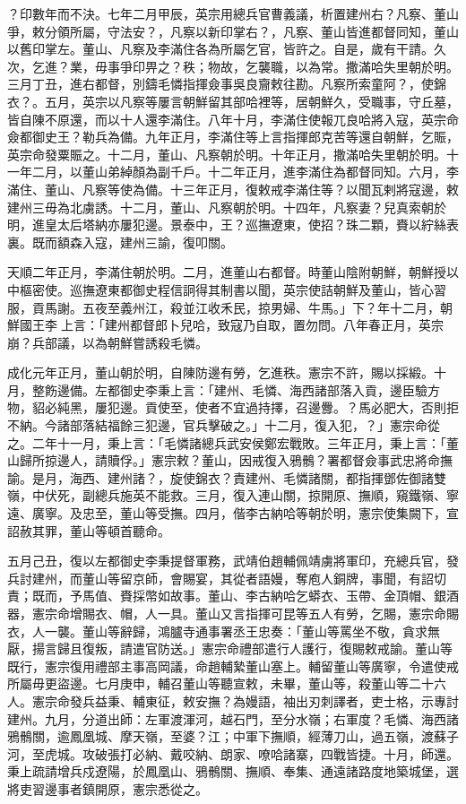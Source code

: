 \begin{pinyinscope}
？印數年而不決。七年二月甲辰，英宗用總兵官曹義議，析置建州右？凡察、董山爭，敕分領所屬，守法安？，凡察以新印掌右？，凡察、董山皆進都督同知，董山以舊印掌左。董山、凡察及李滿住各為所屬乞官，皆許之。自是，歲有干請。久次，乞進？業，毋事爭印畀之？秩；物故，乞襲職，以為常。撒滿哈失里朝於明。三月丁丑，進右都督，別鑄毛憐指揮僉事吳良齎敕往勘。凡察所索童阿？，使錦衣？。五月，英宗以凡察等屢言朝鮮留其部哈裡等，居朝鮮久，受職事，守丘墓，皆自陳不原還，而以十人還李滿住。八年十月，李滿住使報兀良哈將入寇，英宗命僉都御史王？勒兵為備。九年正月，李滿住等上言指揮郎克苦等還自朝鮮，乞賑，英宗命發粟賑之。十二月，董山、凡察朝於明。十年正月，撒滿哈失里朝於明。十一年二月，以董山弟綽顏為副千戶。十二年正月，進李滿住為都督同知。六月，李滿住、董山、凡察等使為備。十三年正月，復敕戒李滿住等？以聞瓦剌將寇邊，敕建州三毋為北虜誘。十二月，董山、凡察朝於明。十四年，凡察妻？兒真索朝於明，進皇太后塔納亦屢犯邊。景泰中，王？巡撫遼東，使招？珠二顆，賚以紵絲表裏。既而額森入寇，建州三諭，復叩關。

天順二年正月，李滿住朝於明。二月，進董山右都督。時董山陰附朝鮮，朝鮮授以中樞密使。巡撫遼東都御史程信詗得其制書以聞，英宗使詰朝鮮及董山，皆心習服，貢馬謝。五夜至義州江，殺並江收禾民，掠男婦、牛馬。」下？年十二月，朝鮮國王李上言：「建州都督郎卜兒哈，致寇乃自取，置勿問。八年春正月，英宗崩？兵部議，以為朝鮮嘗誘殺毛憐。

成化元年正月，董山朝於明，自陳防邊有勞，乞進秩。憲宗不許，賜以採緞。十月，整飭邊備。左都御史李秉上言：「建州、毛憐、海西諸部落入貢，邊臣驗方物，貂必純黑，屢犯邊。貢使至，使者不宜過持擇，召邊釁。？馬必肥大，否則拒不納。今諸部落結福餘三犯邊，官兵擊破之。」十二月，復入犯，？」憲宗命從之。二年十一月，秉上言：「毛憐諸總兵武安侯鄭宏戰敗。三年正月，秉上言：「董山歸所掠邊人，請贖俘。」憲宗敕？董山，因戒復入鴉鶻？署都督僉事武忠將命撫諭。是月，海西、建州諸？，旋使錦衣？責建州、毛憐諸關，都指揮鄧佐御諸雙嶺，中伏死，副總兵施英不能救。三月，復入連山關，掠開原、撫順，窺鐵嶺、寧遠、廣寧。及忠至，董山等受撫。四月，偕李古納哈等朝於明，憲宗使集闕下，宣詔赦其罪，董山等頓首聽命。

五月己丑，復以左都御史李秉提督軍務，武靖伯趙輔佩靖虜將軍印，充總兵官，發兵討建州，而董山等留京師，會賜宴，其從者語嫚，奪庖人銅牌，事聞，有詔切責；既而，予馬值、賚採幣如故事。董山、李古納哈乞蟒衣、玉帶、金頂帽、銀酒器，憲宗命增賜衣、帽，人一具。董山又言指揮可昆等五人有勞，乞賜，憲宗命賜衣，人一襲。董山等辭歸，鴻臚寺通事署丞王忠奏：「董山等罵坐不敬，貪求無厭，揚言歸且復叛，請遣官防送。」憲宗命禮部遣行人護行，復賜敕戒諭。董山等既行，憲宗復用禮部主事高岡議，命趙輔縶董山塞上。輔留董山等廣寧，令遣使戒所屬毋更盜邊。七月庚申，輔召董山等聽宣敕，未畢，董山等，殺董山等二十六人。憲宗命發兵益秉、輔東征，敕安撫？為嫚語，袖出刃刺譯者，吏士格，示專討建州。九月，分道出師：左軍渡渾河，越石門，至分水嶺；右軍度？毛憐、海西諸鴉鶻關，逾鳳凰城、摩天嶺，至婆？江；中軍下撫順，經薄刀山，過五嶺，渡蘇子河，至虎城。攻破張打必納、戴咬納、朗家、嘹哈諸寨，四戰皆捷。十月，師還。秉上疏請增兵戍遼陽，於鳳凰山、鴉鶻關、撫順、奉集、通遠諸路度地築城堡，選將吏習邊事者鎮開原，憲宗悉從之。


\end{pinyinscope}
